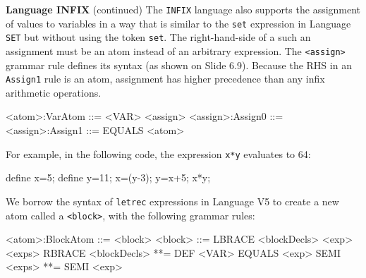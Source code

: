 \begin{minipage}[t]{\sw}
\slidenumber
\LARGE
{\bf Language INFIX} (continued)\exx
The \verb'INFIX' language also supports the assignment
of values to variables in a way that is similar
to the \verb'set' expression in Language \verb'SET'
but without using the token \verb'set'.
The right-hand-side of a such an assignment
must be an atom instead of an arbitrary expression.
The \verb'<assign>' grammar rule defines its syntax
(as shown on Slide 6.9).
Because the RHS in an \verb'Assign1' rule is an atom,
assignment has higher precedence than any infix arithmetic operations.
{\Large
\begin{qv}
<atom>:VarAtom         ::= <VAR> <assign>
<assign>:Assign0       ::=
<assign>:Assign1       ::= EQUALS <atom>
\end{qv}
}
For example, in the following code,
the expression \verb'x*y' evaluates to 64:
{\Large
\begin{qv}
define x=5;
define y=11;
x=(y-3);     %
y=x+5;       %
x*y;         %
\end{qv}
}
We borrow the syntax of \verb'letrec' expressions in Language V5
to create a new atom called a \verb'<block>',
with the following grammar rules:
{\Large
\begin{qv}
<atom>:BlockAtom  ::= <block>
<block>           ::= LBRACE <blockDecls> <exp> <exps> RBRACE
<blockDecls>      **= DEF <VAR> EQUALS <exp> SEMI
<exps>            **= SEMI <exp>
\end{qv}
}
\end{minipage}
